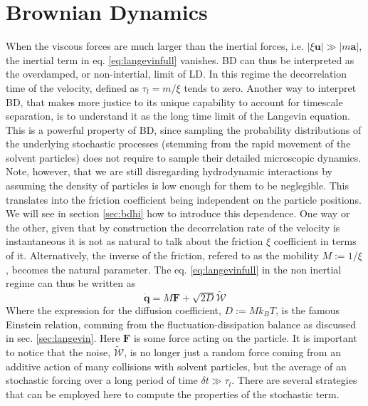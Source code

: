 \documentclass[ twoside,openright,titlepage,numbers=noenddot,%
headinclude,footinclude,cleardoublepage=empty,abstract=on,
BCOR=5mm,paper=a4,fontsize=11pt, dvipsnames
]{scrreprt}
\renewcommand{\vec}[1]{\bm{#1}}
\newcommand{\dt}{\delta t}
\newcommand{\noise}{\widetilde{W}}
\newcommand{\ppos}{q}
\newcommand{\pvel}{u}
\begin{document}
\section{Brownian Dynamics}\label{sec:bd}
When the viscous forces are much larger than the inertial forces, i.e. $ |\xi\vec{\pvel}| \gg |m\vec{a}|$, the inertial term in eq. \eqref{eq:langevinfull} vanishes.
\gls{BD} can thus be interpreted as the overdamped, or non-intertial, limit of \gls{LD}. In this regime the decorrelation time of the velocity, defined as $\tau_l = m/\xi$ tends to zero.
Another way to interpret \gls{BD}, that makes more justice to its unique capability to account for timescale separation, is to understand it as the long time limit of the Langevin equation. This is a powerful property of \gls{BD}, since sampling the probability distributions of the underlying stochastic processes (stemming from the rapid movement of the solvent particles) does not require to sample their detailed microscopic dynamics.
Note, however, that we are still disregarding hydrodynamic interactions by assuming the density of particles is low enough for them to be neglegible. This translates into the friction coefficient being independent on the particle positions. We will see in section \ref{sec:bdhi} how to introduce this dependence.
One way or the other, given that by construction the decorrelation rate of the velocity is instantaneous it is not as natural to talk about the friction $\xi$ coefficient in terms of it. Alternatively, the inverse of the friction, refered to as the mobility $M:=1/\xi$, becomes the natural parameter. The eq. \eqref{eq:langevinfull} in the non inertial regime can thus be written as
\begin{equation}
  \label{eq:bdlange}
  \dot{\vec{\ppos}} = M\vec{F} + \sqrt{2D}\vec{\mathcal{\noise}}
\end{equation}
Where the expression for the diffusion coefficient, $D := Mk_BT$, is the famous Einstein relation\cite{einstein}, comming from the fluctuation-dissipation balance as discussed in sec. \ref{sec:langevin}. Here $\vec{F}$ is some force acting on the particle.
It is important to notice that the noise, $\vec{\mathcal{\noise}}$, is no longer just a random force coming from an additive action of many collisions with solvent particles, but the average of an stochastic forcing over a long period of time $\dt \gg \tau_l$.
There are several strategies that can be employed here to compute the properties of the stochastic term.
\end{document}
